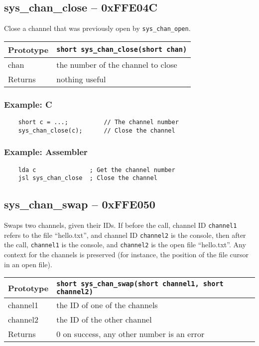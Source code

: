 \subsection*{sys\_chan\_close -- 0xFFE04C}
Close a channel that was previously open by \lstinline|sys_chan_open|.

\bigskip

\begin{tabular}{|l||l|} \hline
Prototype & \lstinline!short sys_chan_close(short chan)! \\ \hline
chan & the number of the channel to close \\ \hline
Returns & nothing useful \\ \hline
\end{tabular}

\subsubsection*{Example: C}
\begin{lstlisting}
    short c = ...;          // The channel number
    sys_chan_close(c);      // Close the channel
\end{lstlisting}

\subsubsection*{Example: Assembler}
\begin{verbatim}
    lda c               ; Get the channel number
    jsl sys_chan_close  ; Close the channel
\end{verbatim}

\subsection*{sys\_chan\_swap -- 0xFFE050}
Swaps two channels, given their IDs. If before the call, channel ID \verb+channel1+ refers to the file ``hello.txt'', and channel ID \verb+channel2+ is the console, then after the call, \verb+channel1+ is the console, and \verb+channel2+ is the open file ``hello.txt''. Any context for the channels is preserved (for instance, the position of the file cursor in an open file).

\bigskip

\begin{tabular}{|l||l|} \hline
Prototype & \lstinline!short sys_chan_swap(short channel1, short channel2)! \\ \hline
channel1 & the ID of one of the channels \\ \hline
channel2 & the ID of the other channel \\ \hline
Returns & 0 on success, any other number is an error \\ \hline
\end{tabular}

